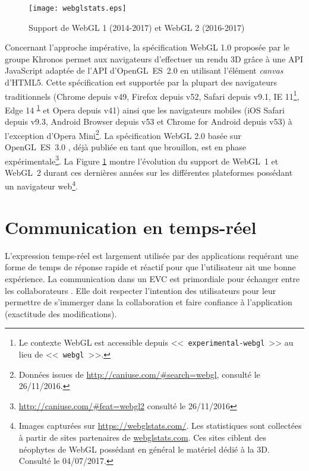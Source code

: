 
\begin{figure}[hbt]
	\centering
	\texttt{[image: webglstats.eps]}
	\caption{Support de WebGL 1 (2014-2017) et WebGL 2 
		(2016-2017)}
	\label{fig:webglstats}
\end{figure}

Concernant l'approche impérative, la spécification WebGL 1.0 \cite{Khronos2011} 
proposée par le groupe Khronos permet aux navigateurs d'effectuer un rendu 3D 
grâce à une \gls{API} JavaScript adaptée de l'\gls{API} d'OpenGL~ES~2.0 
\cite{Khronos2007} en utilisant l'élément \textit{canvas} d'\gls{HTML}5. Cette 
spécification est supportée par la plupart des navigateurs traditionnels (Chrome 
depuis v49, Firefox depuis v52, Safari depuis v9.1, IE 11\footnote{Le contexte 
	WebGL est accessible depuis <<~\texttt{experimental-webgl}~>> au lieu de 
	<<~\texttt{webgl}~>>.\label{fn:webglcontext}}, Edge 14\textsuperscript{ 
	\ref{fn:webglcontext}} et Opera depuis v41) ainsi que les navigateurs mobiles 
	(iOS 
Safari depuis v9.3, Android Browser depuis v53 et Chrome for Android depuis v53) 
à l'exception d'Opera Mini\footnote{Données issues de 
	\url{http://caniuse.com/\#search=webgl}, consulté le 26/11/2016.}. La 
	spécification 
WebGL 2.0 \cite{Khronos2016} basée sur OpenGL~ES~3.0 \cite{Khronos2008}, 
déjà publiée en tant que brouillon, est en phase 
expérimentale\footnote{\url{http://caniuse.com/\#feat=webgl2} consulté le 
	26/11/2016}. La Figure 
\ref{fig:webglstats} montre l'évolution du support de WebGL~1 et WebGL~2 durant 
ces dernières années sur les différentes plateformes possédant un navigateur 
web\footnote{Images capturées sur \url{https://webglstats.com/}. Les statistiques 
	sont collectées à partir de sites partenaires de \url{webglstats.com}. Ces sites 
	ciblent des néophytes de WebGL possédant  en général le matériel 
	dédié à la 3D. Consulté le 04/07/2017.}.

\section{Communication en temps-réel}
L'expression temps-réel est largement utilisée par des applications requérant une 
forme de temps de réponse rapide et réactif pour que l'utilisateur ait une bonne 
expérience. La communication dans un \gls{EVC} est primordiale pour échanger entre les collaborateurs . Elle doit respecter l'intention des utilisateurs pour leur permettre de s'immerger dans la collaboration et faire confiance à l'application (exactitude des modifications).

